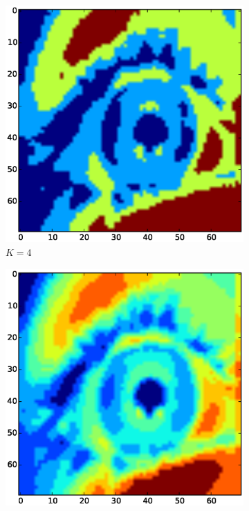 \documentclass[a4paper,11pt]{article}
\begin{document}
\begin{figure}[H]
\centering
\begin{subfigure}{.33\textwidth}
  \centering
  \includegraphics[width=1\linewidth]{kmean_k4_v70}
  \caption{$K=4$}
  \label{fig:kmeans_sub1}
\end{subfigure}%
\begin{subfigure}{.33\textwidth}
  \centering
  \includegraphics[width=1\linewidth]{kmean_k10_v70}

\end{subfigure}
\end{figure}
\end{document}
